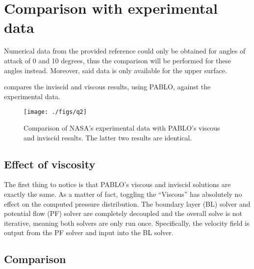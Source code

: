 \section{Comparison with experimental data}
Numerical data from the provided reference could only be obtained for angles of
attack of 0 and 10 degrees, thus the comparison will be performed for these
angles instead. Moreover, said data is only available for the upper surface.

 compares the inviscid and viscous results, using PABLO, against
the experimental data.

\begin{figure}
    \centering
    \texttt{[image: ./figs/q2]}
    \caption{Comparison of NASA's experimental data with PABLO's viscous
        and inviscid results. The latter two results are identical.}\label{fig:q2}
\end{figure}

\subsection{Effect of viscosity}
The first thing to notice is that PABLO's viscous and inviscid solutions are exactly
the same. As a matter of fact, toggling the ``Viscous'' has absolutely no effect on
the computed pressure distribution. The boundary layer (BL) solver and potential flow (PF)
solver are completely decoupled and the overall solve is not iterative, meaning both
solvers are only run once. Specifically, the velocity field is output from the PF solver
and input into the BL solver.

\subsection{Comparison}

